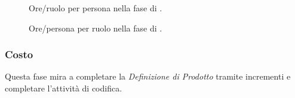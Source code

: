 \pagebreak[4]

\begin{figure}[H]
  \caption{Ore/ruolo per persona nella fase di \PDC.}
\label{fig:pdc1}

\end{figure}




\begin{figure}[H]
\caption{Ore/persona per ruolo nella fase di \PDC.}
\label{fig:pdc2}

\end{figure}


\subsubsection{Costo \PDC}
\introcosto{\PDC}
Questa fase mira a completare la \emph{Definizione di Prodotto} tramite incrementi e completare l'attività di codifica.

